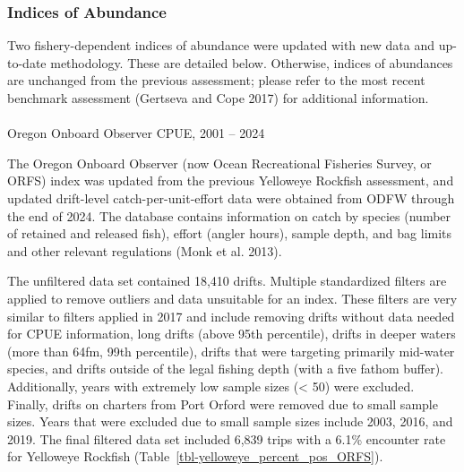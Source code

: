 \documentclass[
  english,
]{article}
\makeatletter
\let\oldparagraph\paragraph
\renewcommand{\paragraph}{
    \@ifstar
      \xxxParagraphStar
      \xxxParagraphNoStar
  }
\newcommand{\xxxParagraphStar}[1]{\oldparagraph*{#1}\mbox{}}
\newcommand{\xxxParagraphNoStar}[1]{\oldparagraph{#1}\mbox{}}
\makeatother
\begin{document}
\subsubsection{Indices of Abundance}\label{indices-of-abundance}

Two fishery-dependent indices of abundance were updated with new data
and up-to-date methodology. These are detailed below. Otherwise, indices
of abundances are unchanged from the previous assessment; please refer
to the most recent benchmark assessment (Gertseva and Cope 2017) for
additional information.

\paragraph{Oregon Onboard Observer CPUE, 2001 --
2024}\label{oregon-onboard-observer-cpue-2001-2024}

The Oregon Onboard Observer (now Ocean Recreational Fisheries Survey, or
ORFS) index was updated from the previous Yelloweye Rockfish assessment,
and updated drift-level catch-per-unit-effort data were obtained from
ODFW through the end of 2024. The database contains information on catch
by species (number of retained and released fish), effort (angler
hours), sample depth, and bag limits and other relevant regulations
(Monk et al. 2013).

The unfiltered data set contained 18,410 drifts. Multiple standardized
filters are applied to remove outliers and data unsuitable for an index.
These filters are very similar to filters applied in 2017 and include
removing drifts without data needed for CPUE information, long drifts
(above 95th percentile), drifts in deeper waters (more than 64fm, 99th
percentile), drifts that were targeting primarily mid-water species, and
drifts outside of the legal fishing depth (with a five fathom buffer).
Additionally, years with extremely low sample sizes (\textless{} 50)
were excluded. Finally, drifts on charters from Port Orford were removed
due to small sample sizes. Years that were excluded due to small sample
sizes include 2003, 2016, and 2019. The final filtered data set included
6,839 trips with a 6.1\% encounter rate for Yelloweye Rockfish
(Table~\ref{tbl-yelloweye_percent_pos_ORFS}).
\end{document}
